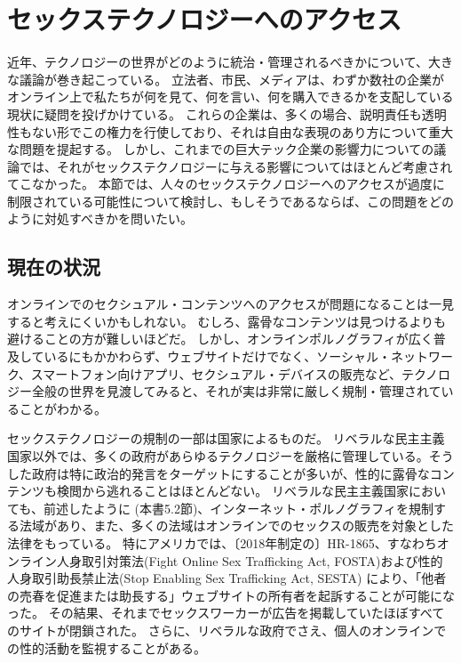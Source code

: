 \documentclass[paper=a4,book,openany]{jlreq} \usepackage{mystyle}
\begin{document}
\section{セックステクノロジーへのアクセス}

近年、テクノロジーの世界がどのように統治・管理されるべきかについて、大きな議論が巻き起こっている。
立法者、市民、メディアは、わずか数社の企業がオンライン上で私たちが何を見て、何を言い、何を購入できるかを支配している現状に疑問を投げかけている。
これらの企業は、多くの場合、説明責任も透明性もない形でこの権力を行使しており、それは自由な表現のあり方について重大な問題を提起する。
しかし、これまでの巨大テック企業の影響力についての議論では、それがセックステクノロジーに与える影響についてはほとんど考慮されてこなかった。
本節では、人々のセックステクノロジーへのアクセスが過度に制限されている可能性について検討し、もしそうであるならば、この問題をどのように対処すべきかを問いたい。

\subsection{現在の状況}

オンラインでのセクシュアル・コンテンツへのアクセスが問題になることは一見すると考えにくいかもしれない。
むしろ、露骨なコンテンツは見つけるよりも避けることの方が難しいほどだ。
しかし、オンラインポルノグラフィが広く普及しているにもかかわらず、ウェブサイトだけでなく、ソーシャル・ネットワーク、スマートフォン向けアプリ、セクシュアル・デバイスの販売など、テクノロジー全般の世界を見渡してみると、それが実は非常に厳しく規制・管理されていることがわかる。

セックステクノロジーの規制の一部は国家によるものだ。
リベラルな民主主義国家以外では、多くの政府があらゆるテクノロジーを厳格に管理している。そうした政府は特に政治的発言をターゲットにすることが多いが、性的に露骨なコンテンツも検閲から逃れることはほとんどない。
リベラルな民主主義国家においても、前述したように (本書5.2節)、インターネット・ポルノグラフィを規制する法域があり、また、多くの法域はオンラインでのセックスの販売を対象とした法律をもっている。
特にアメリカでは、〔2018年制定の〕HR-1865、すなわちオンライン人身取引対策法(Fight Online Sex Trafficking Act, FOSTA)および性的人身取引助長禁止法(Stop Enabling Sex Trafficking Act, SESTA) により、「他者の売春を促進または助長する」ウェブサイトの所有者を起訴することが可能になった。
その結果、それまでセックスワーカーが広告を掲載していたほぼすべてのサイトが閉鎖された\citep{witt18:_after_closur_backp_increas_vulner}。
さらに、リベラルな政府でさえ、個人のオンラインでの性的活動を監視することがある\citep{owen13:_nsa_spied_porn_habit_target_radic}。
\end{document}
